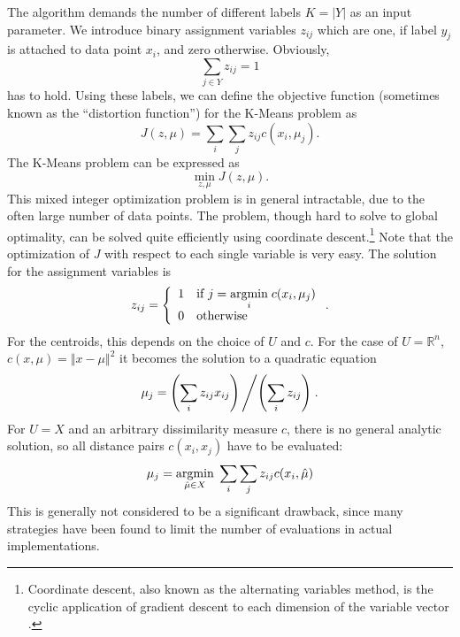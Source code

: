 The algorithm demands the number of different labels $K=|Y|$ as an input parameter.
We introduce binary assignment variables $z_{ij}$ which are one, if label $y_j$ is attached to data point $x_i$, and zero otherwise.
Obviously,
\[\sum_{j\in Y}z_{ij} = 1\]
has to hold.
Using these labels, we can define the objective function (sometimes known as the ``distortion function'') for the K-Means problem as
\begin{equation}
  \label{eq:5}
  J(z, \mu) = \sum_{i}\sum_{j}z_{ij}c(x_i, \mu_j).
\end{equation}
The K-Means problem can be expressed as
\begin{equation}
  \label{eq:3}
  \min\limits_{z, \mu}J(z, \mu).
\end{equation}
This mixed integer optimization problem is in general intractable, due to the often large number of data points.
The problem, though hard to solve to global optimality, can be solved quite efficiently using coordinate descent.\footnote{Coordinate descent, also known as the alternating variables method, is the cyclic application of gradient descent to each dimension of the variable vector \cite{Nocedal1999}.}
Note that the optimization of $J$ with respect to each single variable is very easy.
The solution for the assignment variables is
\begin{equation}
  \label{eq:4}
  z_{ij} = \left\{\begin{array}{ll}1&\text{if }j=\underset{i}{\operatorname{argmin}}\; c(x_i,\mu_j)\\0&\text{otherwise} \end{array}\right. .
\end{equation}
For the centroids, this depends on the choice of $U$ and $c$.
For the case of $U=\mathbb{R}^n$, $c(x,\mu) = \Vert x-\mu\Vert^2$ it becomes the solution to a quadratic equation
\begin{equation}
  \label{eq:6}
  \mu_j = \left(\sum_{i}z_{ij}x_{ij}\right)\left / \left(\sum_{i}z_{ij}\right)\right. .
\end{equation}
For $U=X$ and an arbitrary dissimilarity measure $c$, there is no general analytic solution, so all distance pairs $c(x_i, x_j)$ have to be evaluated:
\begin{equation}
  \label{eq:7}
  \mu_j = \underset{\hat{\mu}\in X}{\operatorname{argmin}}\; \sum_{i}\sum_{j}z_{ij}c(x_i,\hat{\mu})
\end{equation}
This is generally not considered to be a significant drawback, since many strategies have been found to limit the number of evaluations in actual implementations.

